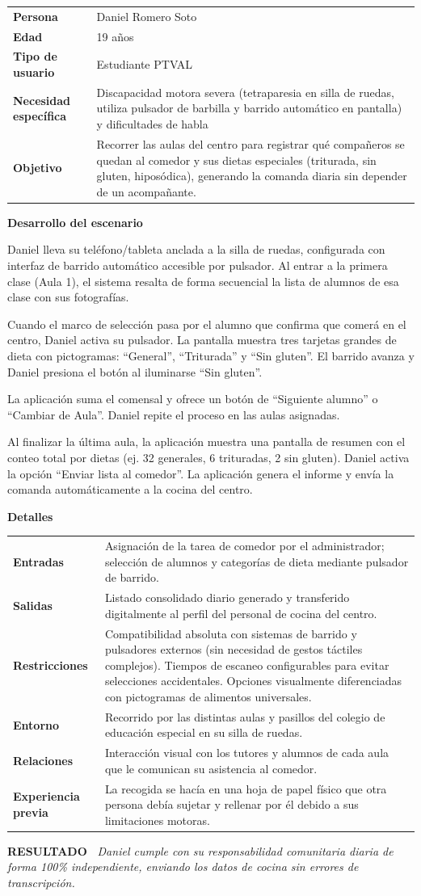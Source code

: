 \documentclass[11pt,a4paper]{article}
\makeatletter
\newcommand{\escenariocard}[6]{%
\needspace{10\baselineskip}
\begin{tcolorbox}[breakable,enhanced,colback=white,colframe=brandgreen,boxrule=0.8pt,arc=3pt,
  left=9pt,right=9pt,top=7pt,bottom=7pt,before skip=10pt,after skip=10pt,
  title={\textbf{\color{white}ESCENARIO #1} \\[1pt] {\small\color{tintgreen}#2}},
  colbacktitle=brandgreen,coltitle=white,fonttitle=\bfseries,boxed title style={colframe=brandgreen}]
{\setlength{\parskip}{0pt}\renewcommand{\arraystretch}{1.35}\rowcolors{1}{tintgreen}{white}\arrayrulecolor{white}
\begin{tabular}{@{\hspace{4pt}}>{\bfseries\color{brandgreen}}p{3.4cm}p{11.4cm}@{}}
#3 \\
\end{tabular}}
\vspace{6pt}
\textbf{\color{brandblue}Desarrollo del escenario}\par\vspace{2pt}
#4
\par\vspace{4pt}
\textbf{\color{brandblue}Detalles}\par\vspace{2pt}
{\setlength{\parskip}{0pt}\renewcommand{\arraystretch}{1.35}\rowcolors{1}{tintblue}{white}\arrayrulecolor{white}
\begin{tabular}{@{\hspace{4pt}}>{\bfseries\color{brandblue}}p{3.4cm}p{11.4cm}@{}}
#5 \\
\end{tabular}}
\vspace{6pt}
\begin{tcolorbox}[colback=tintblue,colframe=brandblue,boxrule=0pt,sharp corners,borderline west={3pt}{0pt}{brandblue},left=8pt,right=8pt,top=5pt,bottom=5pt]
\textbf{\small\color{brandblue}RESULTADO\ } {\small\itshape #6}
\end{tcolorbox}
\end{tcolorbox}
}
\makeatother
\begin{document}
\escenariocard{2}{Registro matutino del menú de comedor mediante pulsador adaptado}{%
Persona & Daniel Romero Soto \\
Edad & 19 años \\
Tipo de usuario & Estudiante PTVAL \\
Necesidad específica & Discapacidad motora severa (tetraparesia en silla de ruedas, utiliza pulsador de barbilla y barrido automático en pantalla) y dificultades de habla \\
Objetivo & Recorrer las aulas del centro para registrar qué compañeros se quedan al comedor y sus dietas especiales (triturada, sin gluten, hiposódica), generando la comanda diaria sin depender de un acompañante.
}{%
Daniel lleva su teléfono/tableta anclada a la silla de ruedas, configurada con interfaz de barrido automático accesible por pulsador. Al entrar a la primera clase (Aula 1), el sistema resalta de forma secuencial la lista de alumnos de esa clase con sus fotografías.

Cuando el marco de selección pasa por el alumno que confirma que comerá en el centro, Daniel activa su pulsador. La pantalla muestra tres tarjetas grandes de dieta con pictogramas: ``General'', ``Triturada'' y ``Sin gluten''. El barrido avanza y Daniel presiona el botón al iluminarse ``Sin gluten''.

La aplicación suma el comensal y ofrece un botón de ``Siguiente alumno'' o ``Cambiar de Aula''. Daniel repite el proceso en las aulas asignadas.

Al finalizar la última aula, la aplicación muestra una pantalla de resumen con el conteo total por dietas (ej. 32 generales, 6 trituradas, 2 sin gluten). Daniel activa la opción ``Enviar lista al comedor''. La aplicación genera el informe y envía la comanda automáticamente a la cocina del centro.
}{%
Entradas & Asignación de la tarea de comedor por el administrador; selección de alumnos y categorías de dieta mediante pulsador de barrido. \\
Salidas & Listado consolidado diario generado y transferido digitalmente al perfil del personal de cocina del centro. \\
Restricciones & Compatibilidad absoluta con sistemas de barrido y pulsadores externos (sin necesidad de gestos táctiles complejos). Tiempos de escaneo configurables para evitar selecciones accidentales. Opciones visualmente diferenciadas con pictogramas de alimentos universales. \\
Entorno & Recorrido por las distintas aulas y pasillos del colegio de educación especial en su silla de ruedas. \\
Relaciones & Interacción visual con los tutores y alumnos de cada aula que le comunican su asistencia al comedor. \\
Experiencia previa & La recogida se hacía en una hoja de papel físico que otra persona debía sujetar y rellenar por él debido a sus limitaciones motoras.
}{Daniel cumple con su responsabilidad comunitaria diaria de forma 100\% independiente, enviando los datos de cocina sin errores de transcripción.}
\end{document}
